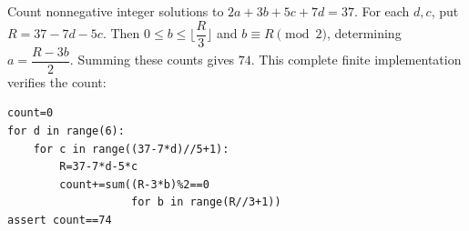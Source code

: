 Count nonnegative integer solutions to $2a+3b+5c+7d=37$. For each $d,c$, put $R=37-7d-5c$. Then $0\le b\le\lfloor\dfrac{R}{3}\rfloor$ and $b\equiv R\pmod2$, determining $a=\dfrac{R-3b}{2}$. Summing these counts gives $\boxed{74}$. This complete finite implementation verifies the count:\begin{verbatim}
count=0
for d in range(6):
    for c in range((37-7*d)//5+1):
        R=37-7*d-5*c
        count+=sum((R-3*b)%2==0
                   for b in range(R//3+1))
assert count==74
\end{verbatim}

